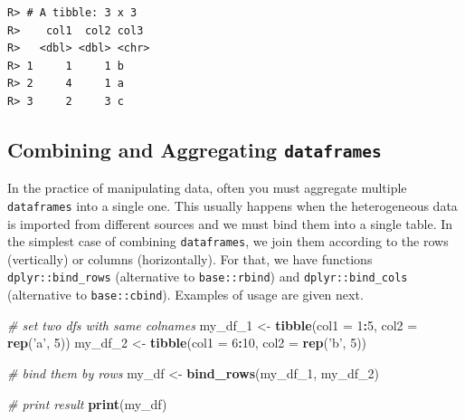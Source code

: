 \documentclass[
  12pt,
]{book}
\newenvironment{Shaded}{\begin{snugshade}}{\end{snugshade}}
\newcommand{\CommentTok}[1]{\textcolor[rgb]{0.37,0.37,0.37}{\textit{#1}}}
\newcommand{\DataTypeTok}[1]{\textcolor[rgb]{0.27,0.27,0.27}{#1}}
\newcommand{\DecValTok}[1]{\textcolor[rgb]{0.06,0.06,0.06}{#1}}
\newcommand{\FloatTok}[1]{\textcolor[rgb]{0.06,0.06,0.06}{#1}}
\newcommand{\KeywordTok}[1]{\textcolor[rgb]{0.27,0.27,0.27}{\textbf{#1}}}
\newcommand{\NormalTok}[1]{#1}
\newcommand{\OperatorTok}[1]{\textcolor[rgb]{0.43,0.43,0.43}{\textbf{#1}}}
\newcommand{\StringTok}[1]{\textcolor[rgb]{0.5,0.5,0.5}{#1}}
\begin{document}
\begin{Shaded}
\end{Shaded}

\begin{verbatim}
R> # A tibble: 3 x 3
R>    col1  col2 col3 
R>   <dbl> <dbl> <chr>
R> 1     1     1 b    
R> 2     4     1 a    
R> 3     2     3 c
\end{verbatim}

\hypertarget{combining-and-aggregating-dataframes}{%
\subsection{\texorpdfstring{Combining and Aggregating \texttt{dataframes}}{Combining and Aggregating dataframes}}\label{combining-and-aggregating-dataframes}}

In the practice of manipulating data, often you must aggregate multiple \texttt{dataframes} into a single one. This usually happens when the heterogeneous data is imported from different sources and we must bind them into a single table. In the simplest case of combining \texttt{dataframes}, we join them according to the rows (vertically) or columns (horizontally). For that, we have functions \texttt{dplyr::bind\_rows} (alternative to \texttt{base::rbind}) and \texttt{dplyr::bind\_cols} (alternative to \texttt{base::cbind}). Examples of usage are given next.  

\begin{Shaded}
\begin{Highlighting}[]
\CommentTok{# set two dfs with same colnames}
\NormalTok{my_df_}\DecValTok{1}\NormalTok{ <-}\StringTok{ }\KeywordTok{tibble}\NormalTok{(}\DataTypeTok{col1 =} \DecValTok{1}\OperatorTok{:}\DecValTok{5}\NormalTok{, }
                  \DataTypeTok{col2 =} \KeywordTok{rep}\NormalTok{(}\StringTok{'a'}\NormalTok{, }\DecValTok{5}\NormalTok{))}
\NormalTok{my_df_}\DecValTok{2}\NormalTok{ <-}\StringTok{ }\KeywordTok{tibble}\NormalTok{(}\DataTypeTok{col1 =} \DecValTok{6}\OperatorTok{:}\DecValTok{10}\NormalTok{, }
                  \DataTypeTok{col2 =} \KeywordTok{rep}\NormalTok{(}\StringTok{'b'}\NormalTok{, }\DecValTok{5}\NormalTok{))}

\CommentTok{# bind them by rows}
\NormalTok{my_df <-}\StringTok{ }\KeywordTok{bind_rows}\NormalTok{(my_df_}\DecValTok{1}\NormalTok{, my_df_}\DecValTok{2}\NormalTok{)}

\CommentTok{# print result}
\KeywordTok{print}\NormalTok{(my_df)}
\end{Highlighting}
\end{Shaded}
\end{document}
